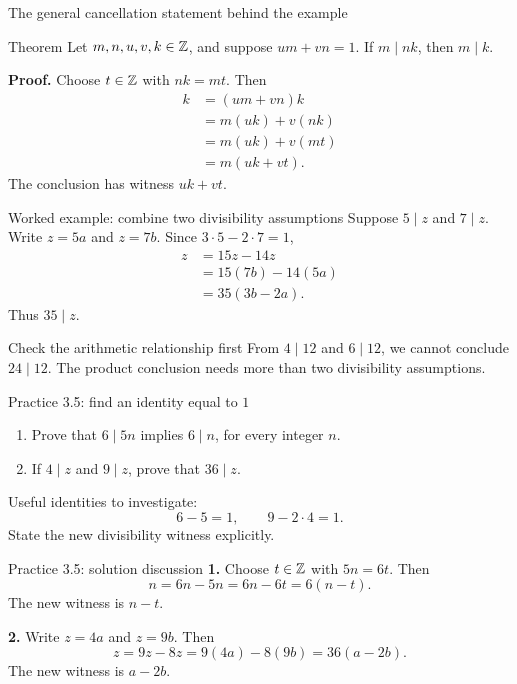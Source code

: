 \begin{frame}{The general cancellation statement behind the example}
\begin{block}{Theorem}
Let $m,n,u,v,k\in\mathbb{Z}$, and suppose $um+vn=1$.
If $m\mid nk$, then $m\mid k$.
\end{block}
\textbf{Proof.} Choose $t\in\mathbb{Z}$ with $nk=mt$. Then
\[
\begin{aligned}
k&=(um+vn)k\\
 &=m(uk)+v(nk)\\
 &=m(uk)+v(mt)\\
 &=m(uk+vt).
\end{aligned}
\]
The conclusion has witness $uk+vt$.
\end{frame}

\begin{frame}{Worked example: combine two divisibility assumptions}
Suppose $5\mid z$ and $7\mid z$. Write $z=5a$ and $z=7b$.
Since $3\cdot5-2\cdot7=1$,
\[
\begin{aligned}
z&=15z-14z\\
 &=15(7b)-14(5a)\\
 &=35(3b-2a).
\end{aligned}
\]
Thus $35\mid z$.
\begin{block}{Check the arithmetic relationship first}
From $4\mid12$ and $6\mid12$, we cannot conclude $24\mid12$.
The product conclusion needs more than two divisibility assumptions.
\end{block}
\end{frame}

\begin{frame}{Practice 3.5: find an identity equal to $1$}
\begin{enumerate}
\item Prove that $6\mid5n$ implies $6\mid n$, for every integer $n$.
\item If $4\mid z$ and $9\mid z$, prove that $36\mid z$.
\end{enumerate}
\vspace{1em}
Useful identities to investigate:
\[
6-5=1,\qquad9-2\cdot4=1.
\]
State the new divisibility witness explicitly.
\end{frame}

\begin{frame}{Practice 3.5: solution discussion}
\textbf{1.} Choose $t\in\mathbb{Z}$ with $5n=6t$. Then
\[
n=6n-5n=6n-6t=6(n-t).
\]
The new witness is $n-t$.
\medskip

\textbf{2.} Write $z=4a$ and $z=9b$. Then
\[
z=9z-8z=9(4a)-8(9b)=36(a-2b).
\]
The new witness is $a-2b$.
\end{frame}

